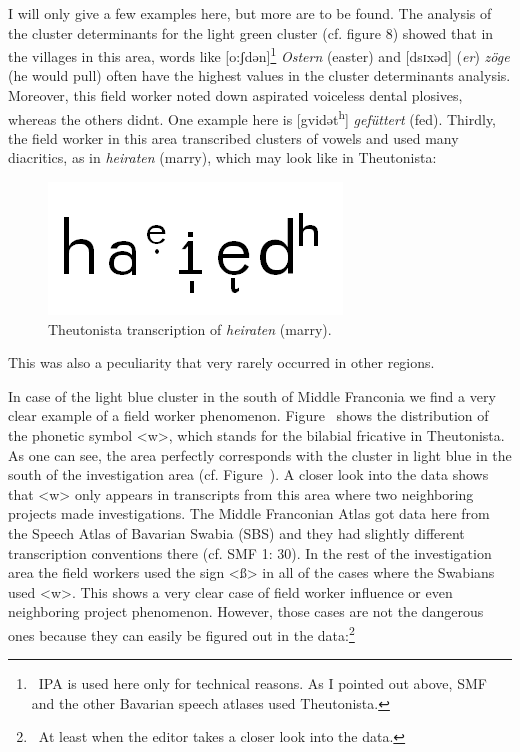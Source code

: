 \documentclass[output=paper]{LSP/langsci}
\begin{document}
I will only give a few examples here, but more are to be found. The analysis of the cluster determinants for the light green cluster (cf. figure 8) showed that in the villages in this area, words like [o:ʃdən]\footnote{\ IPA is used here only for technical reasons. As I pointed out above, SMF and the other Bavarian speech atlases used Theutonista.} \textit{Ostern} ({\textquotesingle}easter{\textquotesingle}) and [dsɪxəd] (\textit{er}) \textit{zöge} ({\textquotesingle}he would pull{\textquotesingle}) often have the highest values in the cluster determinants{\textquotesingle} analysis. Moreover, this field worker noted down aspirated voiceless dental plosives, whereas the others didn{\textquotesingle}t. One example here is [gvidət\textsuperscript{h}] \textit{gefüttert} ({\textquotesingle}fed{\textquotesingle}). Thirdly, the field worker in this area transcribed clusters of vowels and used many diacritics, as in \textit{heiraten} ({\textquotesingle}marry{\textquotesingle}), which may look like  in Theutonista:

\begin{figure}
\includegraphics[width=.25\textwidth]{illustrations/mathus_fig9}
\caption{Theutonista transcription of \textit{heiraten} ({\textquotesingle}marry{\textquotesingle}).}
\label{fig:9}
\end{figure}

This was also a peculiarity that very rarely occurred in other regions.

In case of the light blue cluster in the south of Middle Franconia we find a very clear example of a field worker phenomenon. Figure~ shows the distribution of the phonetic symbol {\textless}w{\textgreater}, which stands for the bilabial fricative in Theutonista. As one can see, the area perfectly corresponds with the cluster in light blue in the south of the investigation area (cf. Figure~). A closer look into the data shows that {\textless}w{\textgreater} only appears in transcripts from this area where two neighboring projects made investigations. The Middle Franconian Atlas got data here from the Speech Atlas of Bavarian Swabia (SBS) and they had slightly different transcription conventions there (cf. SMF 1: 30). In the rest of the investigation area the field workers used the sign {\textless}ß{\textgreater} in all of the cases where the Swabians used {\textless}w{\textgreater}. This shows a very clear case of field worker influence or even neighboring project phenomenon. However, those cases are not the dangerous ones because they can easily be figured out in the data:\footnote{\ At least when the editor takes a closer look into the data.}
\end{document}
